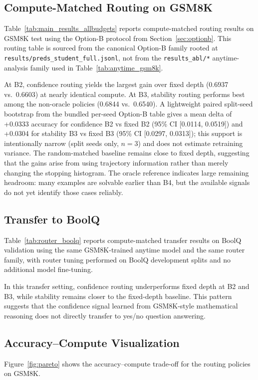 \documentclass[conference]{IEEEtran}
\begin{document}
\subsection{Compute-Matched Routing on GSM8K}
Table~\ref{tab:main_results_allbudgets} reports compute-matched routing results on GSM8K test using the Option-B protocol from Section~\ref{sec:optionb}. This routing table is sourced from the canonical Option-B family rooted at \texttt{results/preds\_student\_full.jsonl}, not from the \texttt{results\_abl/*} anytime-analysis family used in Table~\ref{tab:anytime_gsm8k}.



At B2, confidence routing yields the largest gain over fixed depth (0.6937 vs.\ 0.6603) at nearly identical compute. At B3, stability routing performs best among the non-oracle policies (0.6844 vs.\ 0.6540). A lightweight paired split-seed bootstrap from the bundled per-seed Option-B table gives a mean delta of +0.0333 accuracy for confidence B2 vs fixed B2 (95\% CI [0.0114, 0.0519]) and +0.0304 for stability B3 vs fixed B3 (95\% CI [0.0297, 0.0313]); this support is intentionally narrow (split seeds only, $n{=}3$) and does not estimate retraining variance. The random-matched baseline remains close to fixed depth, suggesting that the gains arise from using trajectory information rather than merely changing the stopping histogram. The oracle reference indicates large remaining headroom: many examples are solvable earlier than B4, but the available signals do not yet identify those cases reliably.

\subsection{Transfer to BoolQ}
Table~\ref{tab:router_boolq} reports compute-matched transfer results on BoolQ validation using the same GSM8K-trained anytime model and the same router family, with router tuning performed on BoolQ development splits and no additional model fine-tuning.



In this transfer setting, confidence routing underperforms fixed depth at B2 and B3, while stability remains closer to the fixed-depth baseline. This pattern suggests that the confidence signal learned from GSM8K-style mathematical reasoning does not directly transfer to yes/no question answering.

\subsection{Accuracy--Compute Visualization}
Figure~\ref{fig:pareto} shows the accuracy--compute trade-off for the routing policies on GSM8K.
\end{document}

